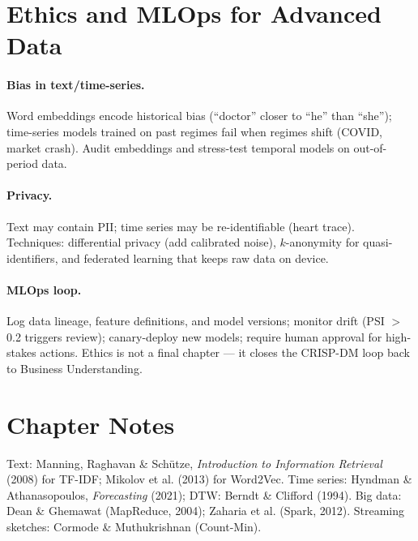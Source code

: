 \section{Ethics and MLOps for Advanced Data}
\label{sec:ethics-advanced}
\paragraph{Bias in text/time-series.} Word embeddings encode historical bias (``doctor'' closer to ``he'' than ``she''); time-series models trained on past regimes fail when regimes shift (COVID, market crash). Audit embeddings and stress-test temporal models on out-of-period data.

\paragraph{Privacy.} Text may contain PII; time series may be re-identifiable (heart trace). Techniques: differential privacy (add calibrated noise), $k$-anonymity for quasi-identifiers, and federated learning that keeps raw data on device.

\paragraph{MLOps loop.} Log data lineage, feature definitions, and model versions; monitor drift (PSI $>$ 0.2 triggers review); canary-deploy new models; require human approval for high-stakes actions. Ethics is not a final chapter --- it closes the CRISP-DM loop back to Business Understanding.

\section{Chapter Notes}
Text: Manning, Raghavan \& Sch\"utze, \emph{Introduction to Information Retrieval} (2008) for TF-IDF; Mikolov et al. (2013) for Word2Vec. Time series: Hyndman \& Athanasopoulos, \emph{Forecasting} (2021); DTW: Berndt \& Clifford (1994). Big data: Dean \& Ghemawat (MapReduce, 2004); Zaharia et al. (Spark, 2012). Streaming sketches: Cormode \& Muthukrishnan (Count-Min).

